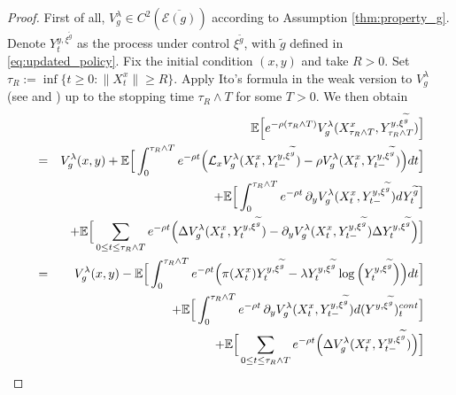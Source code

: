 \documentclass[11pt]{amsart}
\theoremstyle{plain}
\def \dd{{\rm d}}
\numberwithin{equation}{section}
\begin{document}
\begin{proof}
     First of all, $V^\lambda_g \in {C}^{2}\left(\overline{\mathcal{E}(g)}\right)$ according to Assumption \ref{thm:property_g}. %
    Denote $Y_t^{y, \xi^{\widetilde{g}}}$ as the process under control $\xi^{ \widetilde{g}}$, with $ \widetilde{g}$ defined in  \eqref{eq:updated_policy}. Fix the initial condition $(x,y)$ and take $R>0$. Set $\tau_R:=\inf\{t \ge 0: \|X^x_t\| \ge R\}$. Apply Ito's formula in the weak version to $V^\lambda_g$ (see \cite[Chapter 8, Section VIII.4, Theorem 4.1]{fleming2006controlled} and \cite[Theorem 4.2]{angelis2019solvable}) up to the
stopping time $\tau_R\wedge T$ for some $T > 0$. We then obtain
   {\allowdisplaybreaks \begin{eqnarray}
     &&\mathbb{E}\Big[e^{-\rho (\tau_R\wedge T)} V^\lambda_g(X^x_{\tau_R\wedge T},Y^{y, \xi^{\widetilde{g}}}_{\tau_R\wedge T})\Big] \nonumber\\
     &=& V^\lambda_g(x,y)  
     +\mathbb{E}\Big[\int_0^{\tau_R\wedge T} e^{-\rho t} \Big(\mathcal{L}_x V^\lambda_g(X^x_t,Y^{y, \xi^{\widetilde{g}}}_{t-})-\rho V^\lambda_g(X^x_t,Y^{y, \xi^{\widetilde{g}}}_{t-})\Big) \dd t\Big] \nonumber\\
      && + \mathbb{E}\Big[\int_0^{\tau_R\wedge T} e^{-\rho t} \, \partial_y V^\lambda_g(X^x_t,Y^{y, \xi^{\widetilde{g}}}_{t-}) \dd Y_t^{ \widetilde{g}} \Big]\nonumber\\
      &&+\mathbb{E}\Big[\sum_{0\leq t\leq \tau_R\wedge T}  e^{-\rho t}\Big( \Delta V^\lambda_g(X^x_t,Y^{y, \xi^{\widetilde{g}}}_{t}) - \partial_y V^\lambda_g(X^x_t,Y^{y, \xi^{\widetilde{g}}}_{t-})\Delta Y_t^{y, \xi^{\widetilde{g}}} \Big)\Big]\nonumber\\
      &=& V^\lambda_g(x,y) -\mathbb{E}\Big[\int_0^{\tau_R\wedge T} e^{-\rho t} \Big(\pi(X^x_t)Y_t^{y, \xi^{\widetilde{g}}} - \lambda  Y_t^{y, \xi^{\widetilde{g}}} \log\Big(Y_t^{y, \xi^{\widetilde{g}}}\Big) \Big) \dd t\Big] 
      \nonumber\\
      && +\mathbb{E}\Big[ \int_0^{\tau_R\wedge T} e^{-\rho t} \, \partial_y V^\lambda_g(X^x_t,Y^{y, \xi^{\widetilde{g}}}_{t-}) \dd (Y^{y, \xi^{\widetilde{g}}})_t^{\rm cont} \Big]\nonumber\\
      && +\mathbb{E}\Big[\sum_{0\leq t\leq {\tau_R\wedge T}} e^{-\rho t}\Big( \Delta V^\lambda_g(X^x_t,Y^{y, \xi^{\widetilde{g}}}_{t-})  \Big)\Big]\nonumber\\

\end{eqnarray}}
\end{proof}
\end{document}
